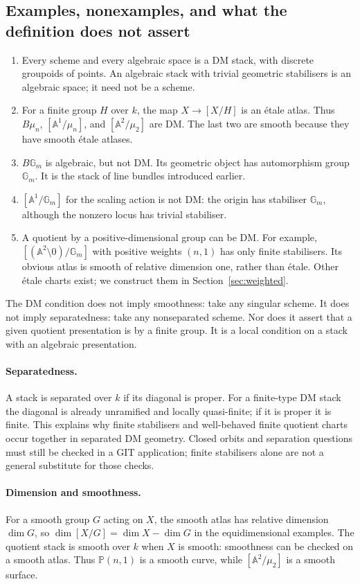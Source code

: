 \documentclass[11pt,a4paper]{article}
\numberwithin{equation}{section}
\theoremstyle{definition}
\newcommand{\A}{\mathbb A}
\newcommand{\PP}{\mathbb P}
\newcommand{\Gm}{\mathbb G_m}
\begin{document}
\subsection{Examples, nonexamples, and what the definition does not assert}
\begin{enumerate}
\item Every scheme and every algebraic space is a DM stack, with discrete
groupoids of points. An algebraic stack with trivial geometric stabilisers is
an algebraic space; it need not be a scheme.
\item For a finite group $H$ over $k$, the map $X\to[X/H]$ is an étale atlas.
Thus $B\mu_n$, $[\A^1/\mu_n]$, and $[\A^2/\mu_2]$ are DM. The last two
are smooth because they have smooth étale atlases.
\item $B\Gm$ is algebraic, but not DM. Its geometric object has automorphism
group $\Gm$. It is the stack of line bundles introduced earlier.
\item $[\A^1/\Gm]$ for the scaling action is not DM: the origin has stabiliser
$\Gm$, although the nonzero locus has trivial stabiliser.
\item A quotient by a positive-dimensional group can be DM. For example,
$[(\A^2\setminus0)/\Gm]$ with positive weights $(n,1)$ has only finite
stabilisers. Its obvious atlas is smooth of relative dimension one, rather
than étale. Other étale charts exist; we construct them in
Section~\ref{sec:weighted}.
\end{enumerate}

The DM condition does not imply smoothness: take any singular scheme. It
does not imply separatedness: take any nonseparated scheme. Nor does it assert
that a given quotient presentation is by a finite group. It is a local
condition on a stack with an algebraic presentation.

\paragraph{Separatedness.}
A stack is separated over $k$ if its diagonal is proper. For a finite-type
DM stack the diagonal is already unramified and locally quasi-finite; if it is proper
it is finite. This explains why finite stabilisers and well-behaved finite
quotient charts occur together in separated DM geometry. Closed orbits and
separation questions must still be checked in a GIT application; finite
stabilisers alone are not a general substitute for those checks.

\paragraph{Dimension and smoothness.}
For a smooth group $G$ acting on $X$, the smooth atlas has relative dimension
$\dim G$, so $\dim[X/G]=\dim X-\dim G$ in the equidimensional examples.
The quotient stack is smooth over $k$ when $X$ is smooth: smoothness can be
checked on a smooth atlas. Thus $\PP(n,1)$ is a smooth curve, while
$[\A^2/\mu_2]$ is a smooth surface.
\end{document}
